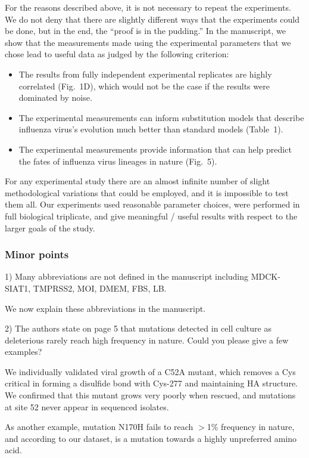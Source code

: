 \documentclass[11pt, oneside]{article}   	%
\newcommand{\response}[1]{{\color{black}#1}}
\begin{document}
\response{For the reasons described above, it is not necessary to repeat the experiments.
We do not deny that there are slightly different ways that the experiments could be done, but in the end, the ``proof is in the pudding.'' 
In the manuscript, we show that the measurements made using the experimental parameters that we chose lead to useful data as judged by the following criterion:
\begin{itemize}
\item The results from fully independent experimental replicates are highly correlated (Fig.~1D), which would not be the case if the results were dominated by noise.
\item The experimental measurements can inform substitution models that describe influenza virus's evolution much better than standard models (Table~1).
\item The experimental measurements provide information that can help predict the fates of influenza virus lineages in nature (Fig.~5).
\end{itemize}
For any experimental study there are an almost infinite number of slight methodological variations that could be employed, and it is impossible to test them all.
Our experiments used reasonable parameter choices, were performed in full biological triplicate, and give meaningful / useful results with respect to the larger goals of the study.}

\subsubsection*{Minor points} 

1) Many abbreviations are not defined in the manuscript including MDCK-SIAT1, TMPRSS2, MOI, DMEM, FBS, LB. 

\response{We now explain these abbreviations in the manuscript.}

2) The authors state on page 5 that mutations detected in cell culture as deleterious rarely reach high frequency in nature. Could you please give a few examples? 

\response{We individually validated viral growth of a C52A mutant, which removes a Cys critical in forming a disulfide bond with Cys-277 and maintaining HA structure.
We confirmed that this mutant grows very poorly when rescued, and mutations at site 52 never appear in sequenced isolates.

As another example, mutation N170H fails to reach $>$1\% frequency in nature, and according to our dataset, is a mutation towards a highly unpreferred amino acid. 
}
\end{document}
